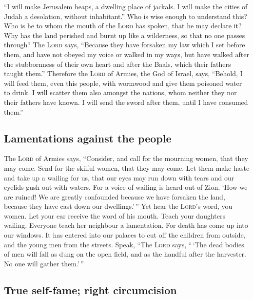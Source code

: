  ``I will make Jerusalem heaps, a dwelling place of
jackals. I will make the cities of Judah a desolation, without
inhabitant.''  Who is wise enough to understand this? Who
is he to whom the mouth of the \textsc{Lord} has spoken, that he may
declare it? Why has the land perished and burnt up like a wilderness, so
that no one passes through?  The \textsc{Lord} says,
``Because they have forsaken my law which I set before them, and have
not obeyed my voice or walked in my ways,  but have
walked after the stubbornness of their own heart and after the Baals,
which their fathers taught them.''  Therefore the
\textsc{Lord} of Armies, the God of Israel, says, ``Behold, I will feed
them, even this people, with wormwood and give them poisoned water to
drink.  I will scatter them also amongst the nations,
whom neither they nor their fathers have known. I will send the sword
after them, until I have consumed them.''

\hypertarget{lamentations-against-the-people}{%
\subsection{Lamentations against the
people}\label{lamentations-against-the-people}}

 The \textsc{Lord} of Armies says, ``Consider, and call
for the mourning women, that they may come. Send for the skilful women,
that they may come.  Let them make haste and take up a
wailing for us, that our eyes may run down with tears and our eyelids
gush out with waters.  For a voice of wailing is heard
out of Zion, `How we are ruined! We are greatly confounded because we
have forsaken the land, because they have cast down our dwellings.'\,''
 Yet hear the \textsc{Lord}'s word, you women. Let your
ear receive the word of his mouth. Teach your daughters wailing.
Everyone teach her neighbour a lamentation.  For death
has come up into our windows. It has entered into our palaces to cut off
the children from outside, and the young men from the streets.
 Speak, ``The \textsc{Lord} says, ``\,`The dead bodies of
men will fall as dung on the open field, and as the handful after the
harvester. No one will gather them.'\,''

\hypertarget{true-self-fame-right-circumcision}{%
\subsection{True self-fame; right
circumcision}\label{true-self-fame-right-circumcision}}

